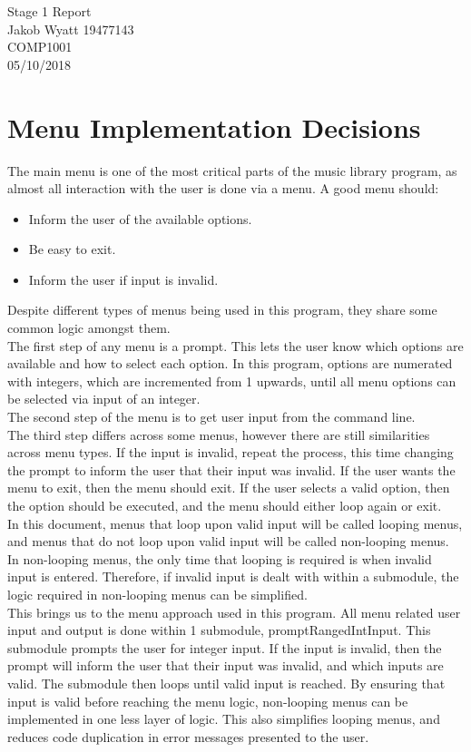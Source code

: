 \documentclass{article}
\begin{document}
    \begin{center}
        \huge
        Stage 1 Report\\
        \large
        Jakob Wyatt 19477143\\
        COMP1001\\
        05/10/2018
    \end{center}
    \normalsize
    \section{Menu Implementation Decisions}
    The main menu is one of the most critical parts of the music library program,
        as almost all interaction with the user is done via a menu.
    A good menu should:
    \begin{itemize}
        \item Inform the user of the available options.
        \item Be easy to exit.
        \item Inform the user if input is invalid.
    \end{itemize}
   	Despite different types of menus being used in this program, they share some common logic amongst them.\\
   	The first step of any menu is a prompt. This lets the user know which options are available and how to select each option.
   	In this program, options are numerated with integers, which are incremented from 1 upwards, until all menu options can be selected
		via input of an integer.\\
   	The second step of the menu is to get user input from the command line.\\
   	The third step differs across some menus, however there are still similarities across menu types.
   	If the input is invalid, repeat the process, this time changing the prompt to inform the user that their input was invalid.
   	If the user wants the menu to exit, then the menu should exit.
   	If the user selects a valid option, then the option should be executed, and the menu should either loop again or exit.\\
   	In this document, menus that loop upon valid input will be called looping menus, and menus that do not loop upon valid input will
   		be called non-looping menus.\\
	In non-looping menus, the only time that looping is required is when invalid input is entered. Therefore, if invalid input is dealt
		with within a submodule, the logic required in non-looping menus can be simplified.\\
	This brings us to the menu approach used in this program. All menu related user input and output is done within 1 submodule, promptRangedIntInput.
	This submodule prompts the user for integer input. If the input is invalid, then the prompt will inform the user that their input was invalid, and which inputs are valid.
	The submodule then loops until valid input is reached. By ensuring that input is valid before reaching the menu logic, non-looping menus can be implemented in one less layer of logic.
	This also simplifies looping menus, and reduces code duplication in error messages presented to the user.
\end{document}
